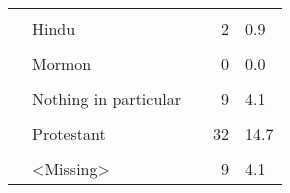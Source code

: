 \documentclass[border=1mm]{standalone}
\begin{document}
\begin{table}[!h]
\begin{tabular}[t]{lllrl}
\cellcolor{gray!10}{} & \cellcolor{gray!10}{Buddhist} & \cellcolor{gray!10}{} & \cellcolor{gray!10}{1} & \cellcolor{gray!10}{0.5}\\
 & Hindu &  & 2 & 0.9\\
\addlinespace
\cellcolor{gray!10}{} & \cellcolor{gray!10}{Jewish} & \cellcolor{gray!10}{} & \cellcolor{gray!10}{3} & \cellcolor{gray!10}{1.4}\\
 & Mormon &  & 0 & 0.0\\
\cellcolor{gray!10}{} & \cellcolor{gray!10}{Muslim} & \cellcolor{gray!10}{} & \cellcolor{gray!10}{2} & \cellcolor{gray!10}{0.9}\\
 & Nothing in particular &  & 9 & 4.1\\
\cellcolor{gray!10}{} & \cellcolor{gray!10}{Orthodox (Greek or Russian)} & \cellcolor{gray!10}{} & \cellcolor{gray!10}{1} & \cellcolor{gray!10}{0.5}\\
\addlinespace
 & Protestant &  & 32 & 14.7\\
\cellcolor{gray!10}{} & \cellcolor{gray!10}{Roman Catholic} & \cellcolor{gray!10}{} & \cellcolor{gray!10}{138} & \cellcolor{gray!10}{63.3}\\
 & <Missing> &  & 9 & 4.1\\
\bottomrule
\end{tabular}
\end{table}
\end{document}
